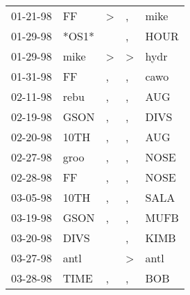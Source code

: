 \begin{supertabular}{p{0.07\textwidth}p{0.06\textwidth}p{0.02\textwidth}p{0.02\textwidth}p{0.06\textwidth}}
          01-21-98\textsuperscript{} &             FF\textsuperscript{} &     \textgreater &                , &           mike\textsuperscript{} \\
          01-29-98\textsuperscript{} &                            *OS1* &                  &                , &           HOUR\textsuperscript{} \\
          01-29-98\textsuperscript{} &           mike\textsuperscript{} &     \textgreater &     \textgreater &           hydr\textsuperscript{} \\
          01-31-98\textsuperscript{} &             FF\textsuperscript{} &                , &                , &           cawo\textsuperscript{} \\
          02-11-98\textsuperscript{} &           rebu\textsuperscript{} &                , &                , &            AUG\textsuperscript{} \\
          02-19-98\textsuperscript{} &           GSON\textsuperscript{} &                , &                , &           DIVS\textsuperscript{} \\
          02-20-98\textsuperscript{} &           10TH\textsuperscript{} &                , &                , &            AUG\textsuperscript{} \\
          02-27-98\textsuperscript{} &           groo\textsuperscript{} &                , &                , &           NOSE\textsuperscript{} \\
          02-28-98\textsuperscript{} &             FF\textsuperscript{} &                , &                , &           NOSE\textsuperscript{} \\
          03-05-98\textsuperscript{} &           10TH\textsuperscript{} &                , &                , &           SALA\textsuperscript{} \\
          03-19-98\textsuperscript{} &           GSON\textsuperscript{} &                , &                , &           MUFB\textsuperscript{} \\
          03-20-98\textsuperscript{} &           DIVS\textsuperscript{} &                  &                , &           KIMB\textsuperscript{} \\
          03-27-98\textsuperscript{} &           antl\textsuperscript{} &                  &     \textgreater &           antl\textsuperscript{} \\
          03-28-98\textsuperscript{} &           TIME\textsuperscript{} &                , &                , &            BOB\textsuperscript{} \\

\end{supertabular}

